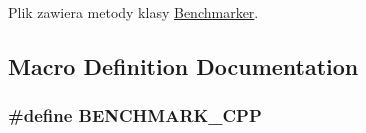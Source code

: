 Plik zawiera metody klasy \hyperlink{a00002}{Benchmarker}. 

\subsection{Macro Definition Documentation}
\hypertarget{a00009_af899221e0ac3b868dd9a8298bd9b1f12}{}
\subsubsection[{B\+E\+N\+C\+H\+M\+A\+R\+K\+\_\+\+C\+P\+P}]{\setlength{\rightskip}{0pt plus 5cm}\#define B\+E\+N\+C\+H\+M\+A\+R\+K\+\_\+\+C\+P\+P}\label{a00009_af899221e0ac3b868dd9a8298bd9b1f12}
